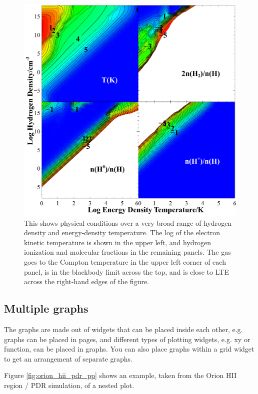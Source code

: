 \begin{figure}
\begin{center}
\includegraphics[clip=on,width=0.9\columnwidth,height=0.7\textheight,keepaspectratio]{grid_extreme}
\end{center}
\caption{This shows physical conditions over a very broad range of hydrogen density 
and energy-density temperature.  
The log of the electron kinetic temperature is shown in the upper left,
and hydrogen ionization and molecular fractions in the remaining panels.
The gas goes to the Compton temperature in the 
upper left corner of each panel, is in the blackbody limit across the top, and is close to LTE 
across the right-hand edges of the figure.}
\label{fig:grid_extreme}
\end{figure}

\subsection{Multiple graphs}

The graphs are made out of widgets that can be placed inside each other, e.g. 
graphs can be placed in pages, and different types of plotting widgets, e.g. xy or function, 
can be placed in graphs. 
You can also place graphs within a grid widget to get an arrangement of separate graphs.

Figure \ref{fig:orion_hii_pdr_pp} shows an example, 
taken from the Orion HII region / PDR simulation, of a nested plot.


